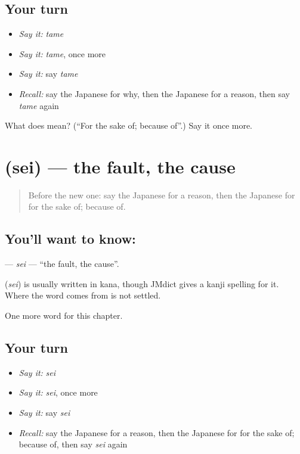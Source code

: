 \subsection*{Your turn}
\begin{itemize}
\raggedright
  \item \emph{Say it:} \emph{tame}
  \item \emph{Say it:} \emph{tame}, once more
  \item \emph{Say it:} say \emph{tame}
  \item \emph{Recall:} say the Japanese for why, then the Japanese for a reason, then say \emph{tame} again
\end{itemize}

\begin{tcolorbox}[breakable,colback=teal!4,colframe=teal!35!black,title={Before you move on}]
What does  mean? (\textquotedblleft{}For the sake of; because of\textquotedblright{}.) Say it once more.
\end{tcolorbox}
\section[\texorpdfstring{\ja{せい} (sei)}{せい (sei)}]{ (sei) — the fault, the cause}

\label{lesson:JA-C98-sei}



\begin{quote}
Before the new one: say the Japanese for a reason, then the Japanese for for the sake of; because of.
\end{quote}

\subsection*{You'll want to know: }
\textbf{} — \emph{sei} — \textquotedblleft{}the fault, the cause\textquotedblright{}.

\begin{cousinweb}
\textbf{} (\emph{sei}) is usually written in kana, though JMdict gives a kanji spelling for it. Where the word comes from is not settled.
\end{cousinweb}

\begin{grammarlens}[title={What you've built}]
One more word for this chapter.
\end{grammarlens}

\subsection*{Your turn}
\begin{itemize}
\raggedright
  \item \emph{Say it:} \emph{sei}
  \item \emph{Say it:} \emph{sei}, once more
  \item \emph{Say it:} say \emph{sei}
  \item \emph{Recall:} say the Japanese for a reason, then the Japanese for for the sake of; because of, then say \emph{sei} again
\end{itemize}

